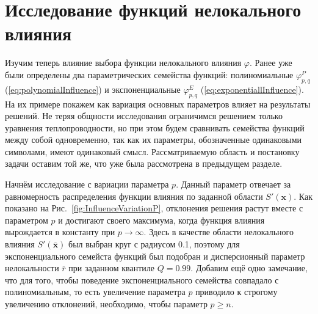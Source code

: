 \section{Исследование функций нелокального влияния}\label{sec:ResultsAnalysis/KeyFeatures}

Изучим теперь влияние выбора функции нелокального влияния $\varphi$. Ранее уже были определены два параметрических семейства функций: полиномиальные $\varphi^P_{p,q}$ (\ref{eq:polynomialInfluence}) и экспоненциальные $\varphi^E_{p,q}$ (\ref{eq:exponentiallInfluence}). На их примере покажем как вариация основных параметров влияет на результаты решений. Не теряя общности исследования ограничимся решением только уравнения теплопроводности, но при этом будем сравнивать семейства функций между собой одновременно, так как их параметры, обозначенные одинаковыми символами, имеют одинаковый смысл. Рассматриваемую область и постановку задачи оставим той же, что уже была рассмотрена в предыдущем разделе.

Начнём исследование с вариации параметра $p$. Данный параметр отвечает за равномерность распределения функции влияния по заданной области $S'(\boldsymbol{x})$. Как показано на Рис.~\ref{fig:InfluenceVariationP}, отклонения решения растут вместе с параметром $p$ и достигают своего максимума, когда функция влияния вырождается в константу при $p \rightarrow \infty$. Здесь в качестве области нелокального влияния $S'(\overline{\boldsymbol{x}})$ был выбран круг с радиусом 0.1, поэтому для экспоненциального семейста функций был подобран и дисперсионный параметр нелокальности $\overline{r}$ при заданном квантиле $Q = 0.99$. Добавим ещё одно замечание, что для того, чтобы поведение экспоненциального семейства совпадало с полиномиальным, то есть увеличение параметра $p$ приводило к строгому увеличению отклонений, необходимо, чтобы параметр $p \geqslant n$.

